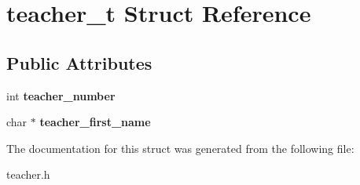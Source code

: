 \hypertarget{structteacher__t}{}\section{teacher\+\_\+t Struct Reference}
\label{structteacher__t}
\subsection*{Public Attributes}
\begin{DoxyCompactItemize}
\item 
\mbox{\label{structteacher__t_a061c604be4761df35bf430aec12e32b9}} 
int {\bfseries teacher\+\_\+number}
\item 
\mbox{\label{structteacher__t_a5f0b333b09ac0262cb4a67a5fa879a64}} 
char $\ast$ {\bfseries teacher\+\_\+first\+\_\+name}
\end{DoxyCompactItemize}


The documentation for this struct was generated from the following file\+:\begin{DoxyCompactItemize}
\item 
teacher.\+h\end{DoxyCompactItemize}
